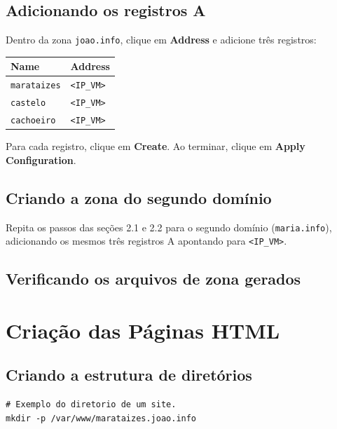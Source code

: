 \documentclass[11pt,a4paper]{article}
\begin{document}
\subsection{Adicionando os registros A}

Dentro da zona \texttt{joao.info}, clique em \textbf{Address} e adicione três registros:

\begin{center}
  \begin{tabular}{|l|l|}
    \hline
    \textbf{Name}      & \textbf{Address} \\
    \hline
    \texttt{marataizes} & \texttt{<IP\_VM>} \\
    \texttt{castelo}    & \texttt{<IP\_VM>} \\
    \texttt{cachoeiro}  & \texttt{<IP\_VM>} \\
    \hline
  \end{tabular}
\end{center}

Para cada registro, clique em \textbf{Create}. Ao terminar, clique em \textbf{Apply Configuration}.

\subsection{Criando a zona do segundo domínio}

Repita os passos das seções 2.1 e 2.2 para o segundo domínio (\texttt{maria.info}),
adicionando os mesmos três registros A apontando para \texttt{<IP\_VM>}.

\subsection{Verificando os arquivos de zona gerados}

\section{Criação das Páginas HTML}

\subsection{Criando a estrutura de diretórios}

\begin{lstlisting}[style=bash]
# Exemplo do diretorio de um site.
mkdir -p /var/www/marataizes.joao.info
\end{lstlisting}
\end{document}
